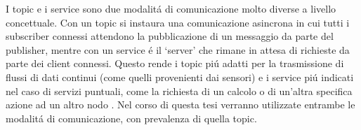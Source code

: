 I topic e i service sono due modalit\'{a} di comunicazione molto diverse a livello concettuale.
Con un topic si instaura una comunicazione asincrona in cui tutti i subscriber connessi attendono la pubblicazione 
di un messaggio da parte del publisher, mentre con un service \'{e} il `server' che rimane in attesa di richieste da 
parte dei client connessi. Questo rende i topic pi\'{u} adatti per la trasmissione di flussi di dati continui (come quelli 
provenienti dai sensori) e i service pi\'{u} indicati nel caso di servizi puntuali, come la richiesta di un calcolo o di un'altra 
specifica azione ad un altro nodo \cite{srv_topic_example}.
Nel corso di questa tesi verranno utilizzate entrambe le modalit\'{a} di comunicazione, con prevalenza di quella topic.